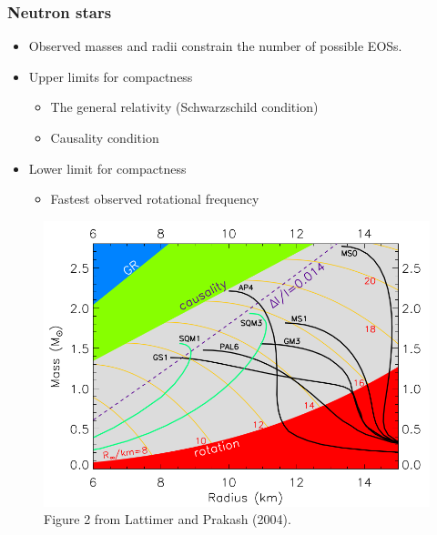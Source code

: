 \documentclass{beamer}
\begin{document}
\begin{frame}
\frametitle{Neutron stars}
\begin{minipage}{0.5\textwidth}
\begin{itemize}
\item Observed masses and radii constrain the number of possible EOSs.
\item Upper limits for compactness
\begin{itemize}
\item The general relativity (Schwarzschild condition)
\item Causality condition
\end{itemize}
\item Lower limit for compactness
\begin{itemize}
\item Fastest observed rotational frequency 
\end{itemize}
\end{itemize}
\end{minipage}%
\begin{minipage}{.5\textwidth}
\begin{figure}
\includegraphics[width=1.1\linewidth]{eos_mr.png}
\caption{Figure 2 from Lattimer and Prakash (2004).}
\end{figure}
\end{minipage}
\end{frame}





\end{document}
